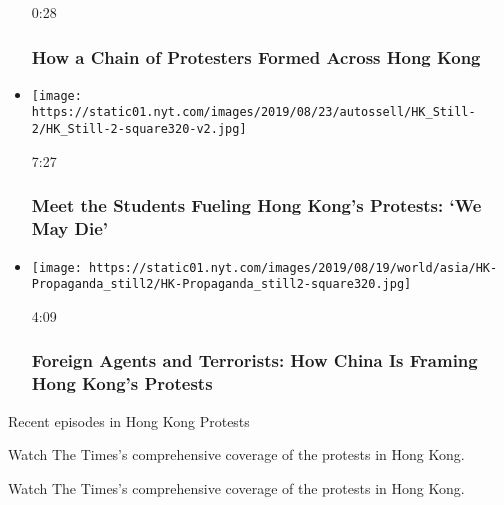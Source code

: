 \begin{itemize}
  0:28

  \hypertarget{how-a-chain-of-protesters-formed-across-hong-kong}{%
  \subsubsection{How a Chain of Protesters Formed Across Hong
  Kong}\label{how-a-chain-of-protesters-formed-across-hong-kong}}
\item
  \href{https://www.nytimes.com/video/world/asia/100000006664889/we-may-die-we-may-be-jailed-on-the-frontlines-with-hong-kongs-protesters.html?action=click\&module=video-series-bar\&region=header\&pgtype=Article\&playlistId=video/hk-protest}{}

  \texttt{[image: https://static01.nyt.com/images/2019/08/23/autossell/HK\_Still-2/HK\_Still-2-square320-v2.jpg]}

  7:27

  \hypertarget{meet-the-students-fueling-hong-kongs-protests-we-may-die}{%
  \subsubsection{Meet the Students Fueling Hong Kong's Protests: `We May
  Die'}\label{meet-the-students-fueling-hong-kongs-protests-we-may-die}}
\item
  \href{https://www.nytimes.com/video/world/asia/100000006660097/foreign-agents-and-terrorists-how-china-is-framing-hong-kongs-protests.html?action=click\&module=video-series-bar\&region=header\&pgtype=Article\&playlistId=video/hk-protest}{}

  \texttt{[image: https://static01.nyt.com/images/2019/08/19/world/asia/HK-Propaganda\_still2/HK-Propaganda\_still2-square320.jpg]}

  4:09

  \hypertarget{foreign-agents-and-terrorists-how-china-is-framing-hong-kongs-protests}{%
  \subsubsection{Foreign Agents and Terrorists: How China Is Framing
  Hong Kong's
  Protests}\label{foreign-agents-and-terrorists-how-china-is-framing-hong-kongs-protests}}
\end{itemize}

Recent episodes in Hong Kong Protests

Watch The Times's comprehensive coverage of the protests in Hong Kong.

Watch The Times's comprehensive coverage of the protests in Hong Kong.

